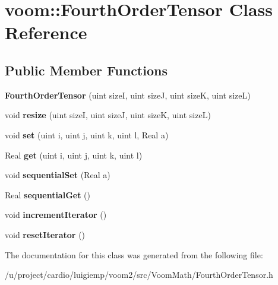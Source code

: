 \hypertarget{classvoom_1_1_fourth_order_tensor}{
\section{voom::FourthOrderTensor Class Reference}
\label{classvoom_1_1_fourth_order_tensor}
}
\subsection*{Public Member Functions}
\begin{DoxyCompactItemize}
\item 
\hypertarget{classvoom_1_1_fourth_order_tensor_ad110f2702da6eefaeb85f794fca3f147}{
{\bfseries FourthOrderTensor} (uint sizeI, uint sizeJ, uint sizeK, uint sizeL)}
\label{classvoom_1_1_fourth_order_tensor_ad110f2702da6eefaeb85f794fca3f147}

\item 
\hypertarget{classvoom_1_1_fourth_order_tensor_a9feabde2ff5701e34f3f25162fe9366a}{
void {\bfseries resize} (uint sizeI, uint sizeJ, uint sizeK, uint sizeL)}
\label{classvoom_1_1_fourth_order_tensor_a9feabde2ff5701e34f3f25162fe9366a}

\item 
\hypertarget{classvoom_1_1_fourth_order_tensor_a31b2d9eeb1f3f3307b4ab5b2f720dfcb}{
void {\bfseries set} (uint i, uint j, uint k, uint l, Real a)}
\label{classvoom_1_1_fourth_order_tensor_a31b2d9eeb1f3f3307b4ab5b2f720dfcb}

\item 
\hypertarget{classvoom_1_1_fourth_order_tensor_a3ce8292721cc43e45b9464445bcbe041}{
Real {\bfseries get} (uint i, uint j, uint k, uint l)}
\label{classvoom_1_1_fourth_order_tensor_a3ce8292721cc43e45b9464445bcbe041}

\item 
\hypertarget{classvoom_1_1_fourth_order_tensor_a66a3683d97f37127ada6606a848d0371}{
void {\bfseries sequentialSet} (Real a)}
\label{classvoom_1_1_fourth_order_tensor_a66a3683d97f37127ada6606a848d0371}

\item 
\hypertarget{classvoom_1_1_fourth_order_tensor_aa992156cd730df3a2d2a85924883b2e2}{
Real {\bfseries sequentialGet} ()}
\label{classvoom_1_1_fourth_order_tensor_aa992156cd730df3a2d2a85924883b2e2}

\item 
\hypertarget{classvoom_1_1_fourth_order_tensor_a6bc0e4decf22e3ce61738bc43d4fe64d}{
void {\bfseries incrementIterator} ()}
\label{classvoom_1_1_fourth_order_tensor_a6bc0e4decf22e3ce61738bc43d4fe64d}

\item 
\hypertarget{classvoom_1_1_fourth_order_tensor_ac9dbccb04a7c2ad963dd13a8090bea2b}{
void {\bfseries resetIterator} ()}
\label{classvoom_1_1_fourth_order_tensor_ac9dbccb04a7c2ad963dd13a8090bea2b}

\end{DoxyCompactItemize}


The documentation for this class was generated from the following file:\begin{DoxyCompactItemize}
\item 
/u/project/cardio/luigiemp/voom2/src/VoomMath/FourthOrderTensor.h\end{DoxyCompactItemize}
